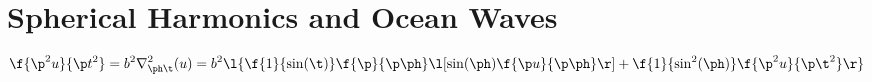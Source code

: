 \chapter{Spherical Harmonics and Ocean Waves}
\begin{comment}
Physics Archives
\end{comment}
$$\f{\p^2u}{\p t^2} = b^2\nabla^2_{\ph\t}(u) = b^2\l\{\f{1}{\sin(\t)}\f{\p}{\p \ph}\l[\sin(\ph)\f{\p u}{\p \ph}\r] + \f{1}{\sin^2(\ph)}\f{\p^2u}{\p \t^2}\r\}$$
